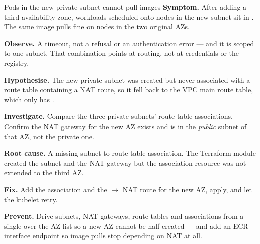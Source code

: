 
\begin{debuglab}{Pods in the new private subnet cannot pull images}
\textbf{Symptom.} After adding a third availability zone, workloads scheduled onto nodes in the new subnet sit in . The same image pulls fine on nodes in the two original AZs.


\begin{tickcheck}
  \item \textbf{Observe.} A timeout, not a refusal or an authentication error --- and it is scoped to one subnet. That combination points at routing, not at credentials or the registry.
  \item \textbf{Hypothesise.} The new private subnet was created but never associated with a route table containing a NAT route, so it fell back to the VPC main route table, which only has .
  \item \textbf{Investigate.} Compare the three private subnets' route table associations. Confirm the NAT gateway for the new AZ exists and is in the \emph{public} subnet of that AZ, not the private one.
  \item \textbf{Root cause.} A missing subnet-to-route-table association. The Terraform module created the subnet and the NAT gateway but the association resource was not extended to the third AZ.
  \item \textbf{Fix.} Add the association and the  $\rightarrow$ NAT route for the new AZ, apply, and let the kubelet retry.
  \item \textbf{Prevent.} Drive subnets, NAT gateways, route tables and associations from a single  over the AZ list so a new AZ cannot be half-created --- and add an ECR interface endpoint so image pulls stop depending on NAT at all.
\end{tickcheck}
\end{debuglab}

